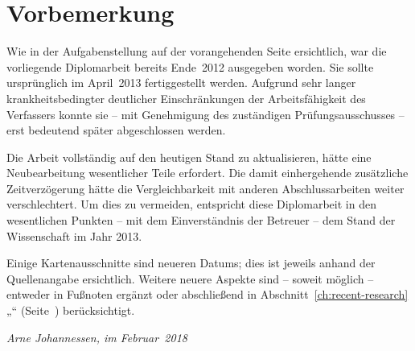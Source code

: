 \documentclass[../main/thesis.tex]{subfiles}
\begin{document}




\chapter*{Vorbemerkung}
\thispagestyle{empty}

Wie in der Aufgabenstellung auf der vorangehenden Seite ersichtlich, war die vorliegende Diplomarbeit bereits Ende~2012 ausgegeben worden.
Sie sollte ursprünglich im April~2013 fertiggestellt werden.
Aufgrund sehr langer krankheitsbedingter deutlicher Einschränkungen der Arbeitsfähigkeit des Verfassers konnte sie -- mit Genehmigung des zuständigen Prüfungsausschusses -- erst bedeutend später abgeschlossen werden.

Die Arbeit vollständig auf den heutigen Stand zu aktualisieren, hätte eine Neubearbeitung wesentlicher Teile erfordert.
Die damit einhergehende zusätzliche Zeitverzögerung hätte die Vergleichbarkeit mit anderen Abschlussarbeiten weiter verschlechtert.
Um dies zu vermeiden, entspricht diese Diplomarbeit in den wesentlichen Punkten -- mit dem Einverständnis der Betreuer -- dem Stand der Wissenschaft im Jahr 2013.


Einige Kartenausschnitte sind neueren Datums; dies ist jeweils anhand der Quellenangabe ersichtlich.
Weitere neuere Aspekte sind -- soweit möglich -- entweder in Fußnoten ergänzt oder abschließend in Abschnitt~\ref{ch:recent-research} „“ (Seite~\pageref{ch:recent-research}) berücksichtigt.

\vspace{1em}

\noindent \textit{Arne Johannessen, im Februar~2018}
\end{document}
